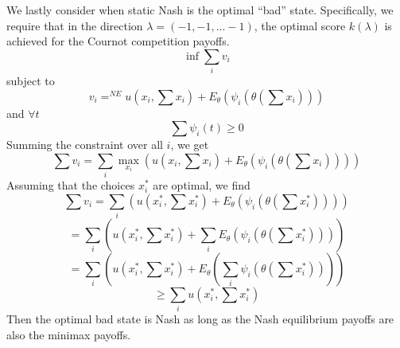 \documentclass[10pt,letter]{article}
\begin{document}
We lastly consider when static Nash is the optimal ``bad'' state. Specifically, we require that in the direction $\lambda =(-1, -1, ... -1)$, the optimal score $k(\lambda)$ is achieved for the Cournot competition payoffs.
\[ \inf \sum_i v_i \]
subject to
\[ v_i =^{NE} u( x_i, \sum x_i ) + E_{\theta}( \psi_i(\theta(\sum x_i)) ) \]
and $\forall t$
\[ \sum \psi_i (t) \ge 0  \]
Summing the constraint over all $i$, we get
\[ \sum v_i = \sum_i \max_{x_i} \left( u( x_i, \sum x_i ) + E_{\theta}( \psi_i(\theta(\sum x_i)) ) \right)  \]
Assuming that the choices $x_i^*$ are optimal, we find
\[ \sum v_i = \sum_i  \left( u( x^*_i, \sum x^*_i ) + E_{\theta}( \psi_i(\theta(\sum x^*_i)) ) \right)  \]
\[ = \sum_i  \left( u( x^*_i, \sum x^*_i ) + \sum_i E_{\theta}( \psi_i(\theta(\sum x^*_i)) ) \right)  \]
\[ = \sum_i  \left( u( x^*_i, \sum x^*_i ) +  E_{\theta}( \sum_i\psi_i(\theta(\sum x^*_i)) ) \right)  \]
\[ \ge \sum_i   u( x^*_i, \sum x^*_i )  \]
Then the optimal bad state is Nash as long as the Nash equilibrium payoffs are also the minimax payoffs.
\end{document}
